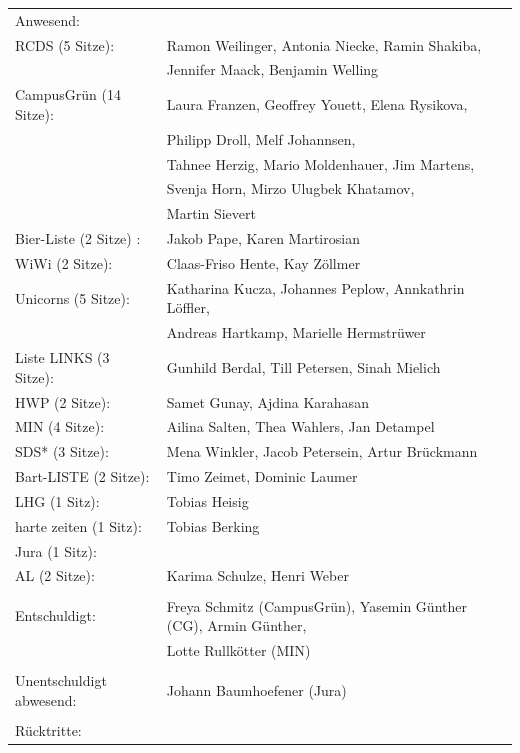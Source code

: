 \documentclass[ngerman,headheight=70pt]{scrartcl}
\begin{document}
    \begin{tabular}{ll}
        Anwesend: & \\
            RCDS (5 Sitze): & Ramon Weilinger, Antonia Niecke, Ramin Shakiba, \\
                            & Jennifer Maack, Benjamin Welling \\
             CampusGrün (14 Sitze): & Laura Franzen, Geoffrey Youett, Elena Rysikova, \\
                                   & Philipp Droll, Melf Johannsen,\\
                                   & Tahnee Herzig, Mario Moldenhauer, Jim Martens,\\
                                   & Svenja Horn, Mirzo Ulugbek Khatamov,\\
                                   & Martin Sievert \\
             Bier-Liste (2 Sitze) : & Jakob Pape, Karen Martirosian \\
             WiWi (2 Sitze): & Claas-Friso Hente, Kay Zöllmer \\
             Unicorns (5 Sitze): & Katharina Kucza, Johannes Peplow, Annkathrin Löffler, \\
                                 & Andreas Hartkamp, Marielle Hermstrüwer \\
             Liste LINKS (3 Sitze): & Gunhild Berdal, Till Petersen, Sinah Mielich \\
             HWP (2 Sitze): & Samet Gunay, Ajdina Karahasan \\
             MIN (4 Sitze): & Ailina Salten, Thea Wahlers, Jan Detampel \\
             SDS* (3 Sitze): & Mena Winkler, Jacob Petersein, Artur Brückmann \\
             Bart-LISTE (2 Sitze): & Timo Zeimet, Dominic Laumer \\
             LHG (1 Sitz): & Tobias Heisig \\
             harte zeiten (1 Sitz): & Tobias Berking \\
             Jura (1 Sitz): & \\
             AL (2 Sitze): & Karima Schulze, Henri Weber \\
            & \\
        Entschuldigt: & Freya Schmitz (CampusGrün), Yasemin Günther (CG), Armin Günther, \\
                      & Lotte Rullkötter (MIN) \\
                                &\\
        Unentschuldigt abwesend: & Johann Baumhoefener (Jura) \\
                                &\\
        Rücktritte: & \\
    \end{tabular}
\end{document}
